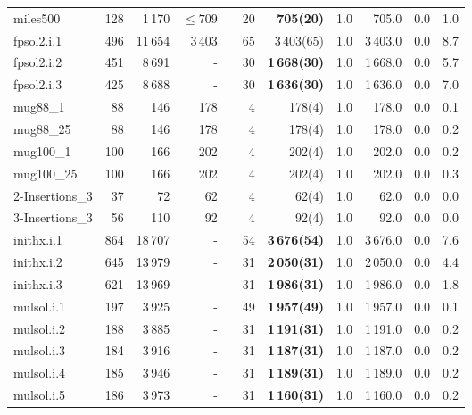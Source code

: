 \documentclass{elsart}
\begin{document}
\begin{table}
\begin{scriptsize}
\begin{tabular}{lrrrcrrrrrr}
miles500    & 128 & 1\,170 & $\le 709$ &&20& \textbf{705(20)} &1.0& 705.0&0.0 & 1.0  \\
fpsol2.i.1    & 496 & 11\,654  &3\,403 &&65&3\,403(65)  &1.0& 3\,403.0&0.0 & 8.7  \\
fpsol2.i.2    & 451 & 8\,691  &-  &&30 &\textbf{1\,668(30)}  &1.0& 1\,668.0 &0.0 & 5.7  \\
fpsol2.i.3    & 425 & 8\,688  &-  &&30 &\textbf{1\,636(30)}  &1.0& 1\,636.0 &0.0 & 7.0  \\
mug88\_1    & 88 & 146 &  178  &&4&  178(4)  &1.0& 178.0&0.0 & 0.1  \\
mug88\_25    & 88 & 146  &  178  &&4&  178(4)  &1.0& 178.0&0.0 & 0.2\\
mug100\_1    & 100 & 166   &  202 &&4&  202(4)  &1.0& 202.0&0.0 & 0.2  \\
mug100\_25    & 100 & 166  &  202   &&4&  202(4)  &1.0& 202.0&0.0 & 0.3\\
2-Insertions\_3    & 37 & 72   &  62 &&4&  62(4)  &1.0& 62.0&0.0 & 0.0  \\
3-Insertions\_3    & 56 & 110  &  92 &&4&  92(4)  &1.0& 92.0&0.0 & 0.0  \\

inithx.i.1   & 864 & 18\,707 &-  &&54 &\textbf{3\,676(54)} &1.0 &3\,676.0 &0.0 &7.6\\
inithx.i.2   & 645 & 13\,979 &-  &&31 &\textbf{2\,050(31)} &1.0 &2\,050.0 &0.0 &4.4\\
inithx.i.3   & 621 & 13\,969 &-  &&31 &\textbf{1\,986(31)} &1.0 &1\,986.0 &0.0 &1.8\\

mulsol.i.1   & 197 & 3\,925 &-  &&49 &\textbf{1\,957(49)} &1.0 &1\,957.0 &0.0 &0.1\\
mulsol.i.2   & 188 & 3\,885 &-  &&31 &\textbf{1\,191(31)} &1.0 &1\,191.0 &0.0 &0.2\\
mulsol.i.3   & 184 & 3\,916 &-  &&31 &\textbf{1\,187(31)} &1.0 &1\,187.0 &0.0 &0.2\\
mulsol.i.4   & 185 & 3\,946 &-  &&31&\textbf{1\,189(31)} &1.0 &1\,189.0 &0.0 &0.2\\
mulsol.i.5   & 186 & 3\,973 &-  &&31 &\textbf{1\,160(31)} &1.0 &1\,160.0 &0.0 &0.2\\


\end{tabular}
\end{scriptsize}
\end{table}
\end{document}
